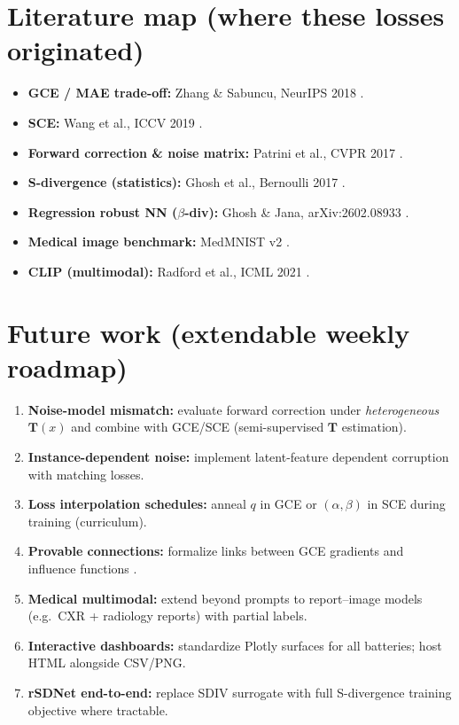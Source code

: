 \documentclass[11pt,a4paper]{article}
\begin{document}
\section{Literature map (where these losses originated)}

\begin{itemize}[leftmargin=*]
  \item \textbf{GCE / MAE trade-off:} Zhang \& Sabuncu, NeurIPS 2018 \cite{zhang2018gce}.
  \item \textbf{SCE:} Wang et al., ICCV 2019 \cite{wang2019sce}.
  \item \textbf{Forward correction \& noise matrix:} Patrini et al., CVPR 2017 \cite{patrini2017}.
  \item \textbf{S-divergence (statistics):} Ghosh et al., Bernoulli 2017 \cite{ghosh2017bern}.
  \item \textbf{Regression robust NN ($\beta$-div):} Ghosh \& Jana, arXiv:2602.08933 \cite{ghosh2026arxiv}.
  \item \textbf{Medical image benchmark:} MedMNIST v2 \cite{yang2023medmnist}.
  \item \textbf{CLIP (multimodal):} Radford et al., ICML 2021 \cite{radford2021clip}.
\end{itemize}

\section{Future work (extendable weekly roadmap)}

\begin{enumerate}[leftmargin=*]
  \item \textbf{Noise-model mismatch:} evaluate forward correction under \emph{heterogeneous} $\mathbf{T}(x)$ and combine with GCE/SCE (semi-supervised $\mathbf{T}$ estimation).
  \item \textbf{Instance-dependent noise:} implement latent-feature dependent corruption \cite{xiao2015} with matching losses.
  \item \textbf{Loss interpolation schedules:} anneal $q$ in GCE or $(\alpha,\beta)$ in SCE during training (curriculum).
  \item \textbf{Provable connections:} formalize links between GCE gradients and influence functions \cite{hampel2011robust}.
  \item \textbf{Medical multimodal:} extend beyond prompts to report--image models (e.g.\ CXR + radiology reports) with partial labels.
  \item \textbf{Interactive dashboards:} standardize Plotly surfaces for all batteries; host HTML alongside CSV/PNG.
  \item \textbf{rSDNet end-to-end:} replace SDIV surrogate with full S-divergence training objective where tractable.
\end{enumerate}
\end{document}
